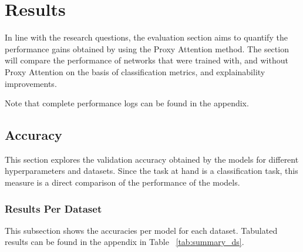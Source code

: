 \chapter{Results}
In line with the research questions, the evaluation section aims to quantify the performance gains obtained by using the Proxy Attention method. The section will compare the performance of networks that were trained with, and without Proxy Attention on the basis of classification metrics, and explainability improvements.

Note that complete performance logs can be found in the appendix.
\section{Accuracy}
This section explores the validation accuracy obtained by the models for different hyperparameters and datasets. Since the task at hand is a classification task, this measure is a direct comparison of the performance of the models.

\subsection{Results Per Dataset}
This subsection shows the accuracies per model for each dataset. Tabulated results can be found in the appendix in Table ~\ref{tab:summary_ds}.

